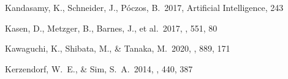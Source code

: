 \documentclass[twocolumn, twocolappendix]{aastex63}
\begin{document}
\begin{thebibliography}{}
 Kandasamy, K., Schneider, J., P{\'o}czos, B.\ 2017, Artificial Intelligence, 243








 Kasen, D., Metzger, B., Barnes, J., et al.\ 2017, \nat, 551, 80












 Kawaguchi, K., Shibata, M., \& Tanaka, M.\ 2020, \apj, 889, 171


 Kerzendorf, W.~E., \& Sim, S.~A.\ 2014, \mnras, 440, 387













\end{thebibliography}
\end{document}
